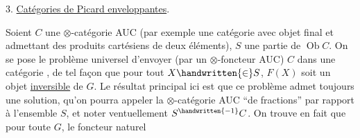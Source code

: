 3. \uline{Catégories de Picard enveloppantes}.

Soient $C$ une  $\otimes$-catégorie AUC (par exemple une catégorie avec objet final et admettant des produits cartésiens de deux éléments), $S$ une partie de $\operatorname{Ob}C$. On se pose le problème universel d'envoyer (par un $\otimes$-foncteur AUC) $C$ dans une \inserted{$\otimes$-}catégorie , de tel façon que pour tout $X\handwritten{\in}S$, $F(X)$ soit un objet \uline{inversible} de $G$. Le résultat principal ici est que ce problème admet toujours une solution, qu'on pourra appeler la $\otimes$-catégorie AUC ``de fractions'' par rapport à l'ensemble $S$, et noter ventuellement $S^{\handwritten{-1}}C$. On trouve en fait que pour toute $G$, le foncteur naturel
